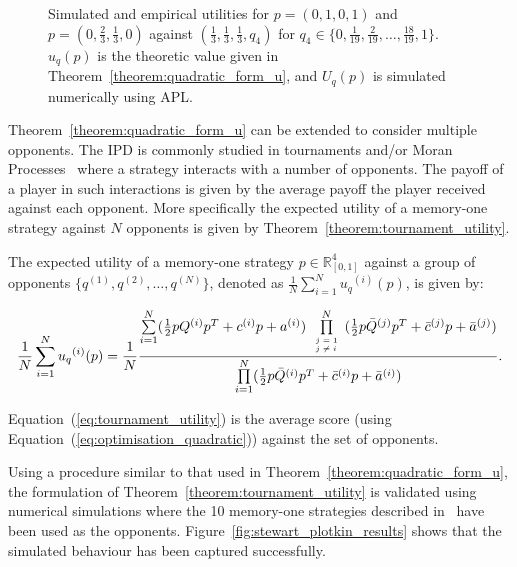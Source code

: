 \begin{figure}[!htbp]
\begin{center}
\begin{subfigure}{0.5\textwidth}
        \end{subfigure}
    \end{center}
    \caption{Simulated and empirical utilities for \(p = (0, 1, 0, 1)\)
    and \(p = (0, \frac{2}{3}, \frac{1}{3}, 0)\) against \((\frac{1}{3}, \frac{1}{3}, \frac{1}{3}, q_4)\) for
    \(q_4 \in \{0,  \frac{1}{19}, \frac{2}{19}, \dots, \frac{18}{19}, 1\}\).
    \(u_q(p)\) is the theoretic value given in Theorem~\ref{theorem:quadratic_form_u},
    and \(U_q(p)\) is simulated numerically using APL.}
    \label{fig:analytical_simulated}
\end{figure}

Theorem~\ref{theorem:quadratic_form_u} can be extended to consider multiple
opponents. The IPD is commonly studied in tournaments and/or Moran Processes~\cite{Kaiping2014}
where a strategy interacts with a number of opponents. The payoff of a player in
such interactions is given by the average payoff the player received against
each opponent. More specifically the expected utility of a memory-one strategy
against \(N\) opponents is given by Theorem~\ref{theorem:tournament_utility}.

\begin{theorem}\label{theorem:tournament_utility}
    The expected utility of a memory-one strategy \(p\in\mathbb{R}_{[0,1]}^4\)
    against a group of opponents \(\{q^{(1)}, q^{(2)}, \dots, q^{(N)}\}\), denoted
    as \(\frac{1}{N} \sum\limits_{i=1} ^ {N} {u_q}^{(i)} (p)\), is given by:

    \begin{equation}\label{eq:tournament_utility}
        \frac{1}{N} \sum\limits_{i=1} ^ {N} {u_q}^{(i)} (p) = \frac{1}{N}
        \frac{\sum\limits_{i=1} ^ {N} (\frac{1}{2} pQ^{(i)} p^T + c^{(i)} p + a^ {(i)})
        \prod\limits_{\tiny\begin{array}{l} j=1 \\ j \neq i \end{array}} ^
        N (\frac{1}{2} p\bar{Q}^{(j)} p^T + \bar{c}^{(j)} p + \bar{a}^ {(j)})}
        {\prod\limits_{i=1} ^ N (\frac{1}{2} p\bar{Q}^{(i)} p^T + \bar{c}^{(i)} p + \bar{a}^ {(i)})}.
    \end{equation}
\end{theorem}

Equation~(\ref{eq:tournament_utility}) is the average score
(using Equation~(\ref{eq:optimisation_quadratic})) against the set of opponents.

Using a procedure similar to that used in Theorem~\ref{theorem:quadratic_form_u},
the formulation of
Theorem~\ref{theorem:tournament_utility} is validated using numerical
simulations where the 10 memory-one strategies described in~\cite{Stewart2012}
have been used as the opponents. Figure~\ref{fig:stewart_plotkin_results} shows
that the simulated behaviour has been captured successfully.

